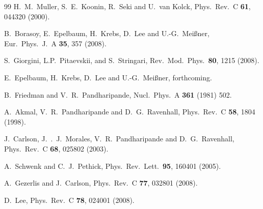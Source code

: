 \documentclass[aps,rmp,nofootinbib,twocolumn,floatfix]{revtex4}
\begin{document}
\begin{thebibliography}{99}
  H.~M.~Muller, S.~E.~Koonin, R.~Seki and U.~van Kolck,
  Phys.\ Rev.\  C {\bf 61}, 044320 (2000).

  B.~Borasoy, E.~Epelbaum, H.~Krebs, D.~Lee and U.-G.~Mei{\ss}ner,
  Eur.\ Phys.\ J.\  A {\bf 35}, 357 (2008).

S.~Giorgini, L.P.~Pitaevskii, and S.~Stringari,
Rev.\ Mod.\ Phys.\  {\bf 80}, 1215 (2008). 

 E.~Epelbaum, H.~Krebs, D.~Lee and U.-G.~Mei{\ss}ner, forthcoming.



  B.~Friedman and V.~R.~Pandharipande,
  Nucl.\ Phys.\  A {\bf 361} (1981) 502.

  A.~Akmal, V.~R.~Pandharipande and D.~G.~Ravenhall,
  Phys.\ Rev.\  C {\bf 58}, 1804 (1998).

  J.~Carlson, J.~.~J.~Morales, V.~R.~Pandharipande and D.~G.~Ravenhall,
  Phys.\ Rev.\  C {\bf 68}, 025802 (2003).

  A.~Schwenk and C.~J.~Pethick,
  Phys.\ Rev.\ Lett.\  {\bf 95}, 160401 (2005).

  A.~Gezerlis and J.~Carlson,
  Phys.\ Rev.\  C {\bf 77}, 032801 (2008).

  D.~Lee,
  Phys.\ Rev.\  C {\bf 78}, 024001 (2008).






\end{thebibliography}
\end{document}
